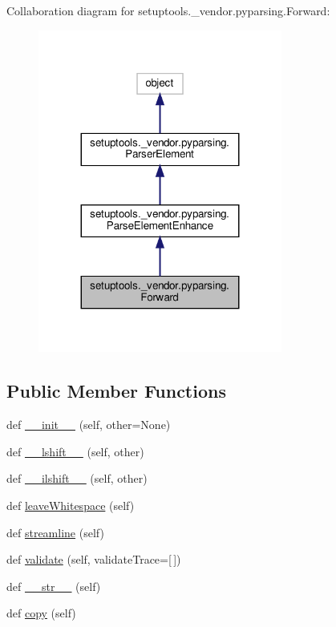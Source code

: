 Collaboration diagram for setuptools.\+\_\+vendor.\+pyparsing.\+Forward\+:
\nopagebreak
\begin{figure}[H]
\begin{center}
\leavevmode
\includegraphics[width=227pt]{classsetuptools_1_1__vendor_1_1pyparsing_1_1Forward__coll__graph}
\end{center}
\end{figure}
\subsection*{Public Member Functions}
\begin{DoxyCompactItemize}
\item 
def \hyperlink{classsetuptools_1_1__vendor_1_1pyparsing_1_1Forward_ab532b2808c448383b14649bcb8a2713f}{\+\_\+\+\_\+init\+\_\+\+\_\+} (self, other=None)
\item 
def \hyperlink{classsetuptools_1_1__vendor_1_1pyparsing_1_1Forward_a7a5435ba3dd13a3b774f26fbacff5176}{\+\_\+\+\_\+lshift\+\_\+\+\_\+} (self, other)
\item 
def \hyperlink{classsetuptools_1_1__vendor_1_1pyparsing_1_1Forward_a051c04093fda708b2b3bdc9cd559046f}{\+\_\+\+\_\+ilshift\+\_\+\+\_\+} (self, other)
\item 
def \hyperlink{classsetuptools_1_1__vendor_1_1pyparsing_1_1Forward_a30743081aec9c01e278d10cd4ce4559a}{leave\+Whitespace} (self)
\item 
def \hyperlink{classsetuptools_1_1__vendor_1_1pyparsing_1_1Forward_a00d14430e293df09f285d039810e9df8}{streamline} (self)
\item 
def \hyperlink{classsetuptools_1_1__vendor_1_1pyparsing_1_1Forward_a5909b6cd69413a1118fced026cbdac6f}{validate} (self, validate\+Trace=\mbox{[}$\,$\mbox{]})
\item 
def \hyperlink{classsetuptools_1_1__vendor_1_1pyparsing_1_1Forward_a8088bd04748bdb14a9546f2bebadcb8c}{\+\_\+\+\_\+str\+\_\+\+\_\+} (self)
\item 
def \hyperlink{classsetuptools_1_1__vendor_1_1pyparsing_1_1Forward_ab4bece014b10ec330acf69fb8aaa36ab}{copy} (self)
\end{DoxyCompactItemize}
